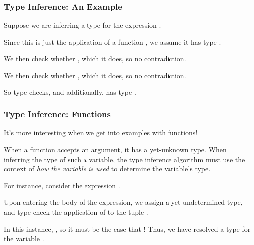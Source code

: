 \documentclass[aspectratio=169]{beamer}
\begin{document}
\begin{frame}[fragile]
  \frametitle{Type Inference: An Example}

  Suppose we are inferring a type for the expression .

  \pause
  \vspace{\fill}

  Since this is just the application of a function ,
  we assume it has type .

  \pause
  \vspace{\fill}

  We then check whether , which it does, so no contradiction.

  \pause
  \vspace{\fill}

  We then check whether , which it does, so no contradiction.

  \pause
  \vspace{\fill}

  So  type-checks, and additionally, has type .
\end{frame}

\begin{frame}[fragile]
  \frametitle{Type Inference: Functions}

  It's more interesting when we get into examples with functions!

  \pause
  \vspace{\fill}

  When a function accepts an argument, it has a yet-unknown type. When
  inferring the type of such a variable, the type inference algorithm must
  use the context of \textit{how the variable is used} to determine the
  variable's type.

  \pause
  \vspace{\fill}

  For instance, consider the expression .

  \pause
  \vspace{\fill}

  Upon entering the body of the expression, we assign  a yet-undetermined
  type, and type-check the application of \code{+} to the tuple .

  \pause
  \vspace{\fill}

  In this instance, , so it must be the case that
  ! Thus, we have resolved a type for the variable .
\end{frame}
\end{document}
